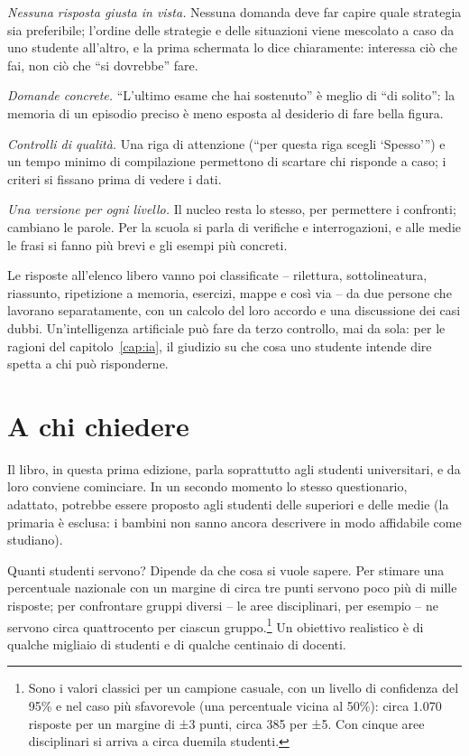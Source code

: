 \emph{Nessuna risposta giusta in vista.} Nessuna domanda deve far
capire quale strategia sia preferibile; l'ordine delle strategie e delle
situazioni viene mescolato a caso da uno studente all'altro, e la prima
schermata lo dice chiaramente: interessa ciò che fai, non ciò che
\enquote{si dovrebbe} fare.

\emph{Domande concrete.} \enquote{L'ultimo esame che hai sostenuto} è
meglio di \enquote{di solito}: la memoria di un episodio preciso è meno
esposta al desiderio di fare bella figura.

\emph{Controlli di qualità.} Una riga di attenzione (\enquote{per
questa riga scegli \enquote{Spesso}}) e un tempo minimo di compilazione
permettono di scartare chi risponde a caso; i criteri si fissano prima
di vedere i dati.

\emph{Una versione per ogni livello.} Il nucleo resta lo stesso, per
permettere i confronti; cambiano le parole. Per la scuola si parla di
verifiche e interrogazioni, e alle medie le frasi si fanno più brevi e
gli esempi più concreti.

Le risposte all'elenco libero vanno poi classificate -- rilettura,
sottolineatura, riassunto, ripetizione a memoria, esercizi, mappe e
così via -- da due persone che lavorano separatamente, con un calcolo
del loro accordo e una discussione dei casi dubbi. Un'intelligenza
artificiale può fare da terzo controllo, mai da sola: per le ragioni
del capitolo~\ref{cap:ia}, il giudizio su che cosa uno studente intende
dire spetta a chi può risponderne.

\section{A chi chiedere}

Il libro, in questa prima edizione, parla soprattutto agli studenti
universitari, e da loro conviene cominciare. In un secondo momento lo
stesso questionario, adattato, potrebbe essere proposto agli studenti
delle superiori e delle medie (la primaria è esclusa: i bambini non
sanno ancora descrivere in modo affidabile come studiano).

Quanti studenti servono? Dipende da che cosa si vuole sapere. Per
stimare una percentuale nazionale con un margine di circa tre punti
servono poco più di mille risposte; per confrontare gruppi diversi --
le aree disciplinari, per esempio -- ne servono circa quattrocento per
ciascun gruppo.\footnote{Sono i valori classici per un campione
casuale, con un livello di confidenza del 95\% e nel caso più
sfavorevole (una percentuale vicina al 50\%): circa 1.070 risposte per
un margine di ±3 punti, circa 385 per ±5. Con cinque aree
disciplinari si arriva a circa duemila studenti.} Un obiettivo
realistico è di qualche migliaio di studenti e di qualche centinaio di
docenti.


